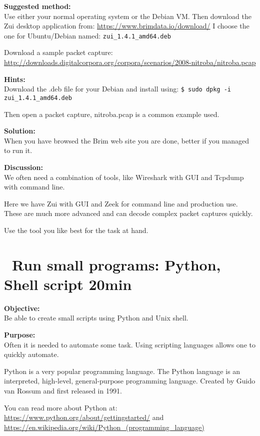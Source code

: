 \documentclass[a4paper,11pt,notitlepage]{report}
\begin{document}
{\bf Suggested method:}\\
Use either your normal operating system or the Debian VM. Then download the Zui desktop application from:
\url{https://www.brimdata.io/download/} I choose the one for Ubuntu/Debian named: \verb+zui_1.4.1_amd64.deb+

Download a sample packet capture:\\
\url{http://downloads.digitalcorpora.org/corpora/scenarios/2008-nitroba/nitroba.pcap}


{\bf Hints:}\\
Download the .deb file for your Debian and install using:
\verb+$ sudo dpkg -i zui_1.4.1_amd64.deb+

Then open a packet capture, nitroba.pcap is a common example used.

{\bf Solution:}\\
When you have browsed the Brim web site you are done, better if you managed to run it.

{\bf Discussion:}\\
We often need a combination of tools, like Wireshark with GUI and Tcpdump with command line.

Here we have Zui with GUI and Zeek for command line and production use. These are much more advanced and can decode complex packet captures quickly.

Use the tool you like best for the task at hand.


\chapter{\faInfoCircle\ Run small programs: Python, Shell script 20min}
\label{ex:small-python}

{\bf Objective:}\\
Be able to create small scripts using Python and Unix shell.

{\bf Purpose:}\\
Often it is needed to automate some task. Using scripting languages allows one to quickly automate.

Python is a very popular programming language. The Python language
is an interpreted, high-level, general-purpose programming language. Created by Guido van Rossum and first released in 1991.


You can read more about Python at:\\
\url{https://www.python.org/about/gettingstarted/} and \\
\url{https://en.wikipedia.org/wiki/Python_(programming_language)}
\end{document}
